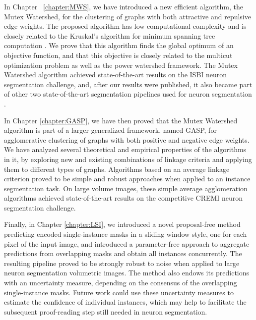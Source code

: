 In Chapter ~\ref{chapter:MWS}, we have introduced a new efficient algorithm, the Mutex Watershed, for the clustering of graphs with both attractive and repulsive edge weights. The proposed algorithm has low computational complexity and is closely related to the Kruskal's algorithm for minimum spanning tree computation \cite{kruskal1956shortest}.
We prove that this algorithm finds the global optimum of an objective function, and that this objective is closely related to the multicut optimization problem as well as the power watershed framework.
The Mutex Watershed algorithm achieved state-of-the-art results on the ISBI neuron segmentation challenge, and, after our results were published, it also became part of other two state-of-the-art segmentation pipelines used for neuron segmentation \cite{hirsch2020patchperpix,lee2019learning}.

In Chapter \ref{chapter:GASP}, we have then proved that the Mutex Watershed algorithm is part of a larger generalized framework, named GASP, for agglomerative clustering of graphs with both positive and negative edge weights. We have analyzed several theoretical and empirical properties of the algorithms in it, by exploring new and existing combinations of linkage criteria and applying them to different types of graphs. Algorithms based on an average linkage criterion proved to be simple and robust approaches when applied to an instance segmentation task. On large volume images, these simple average agglomeration algorithms achieved state-of-the-art results on the competitive CREMI neuron segmentation challenge. 

Finally, in Chapter \ref{chapter:LSI}, we introduced a novel proposal-free method predicting encoded single-instance masks in a sliding window style, one for each pixel of the input image, and introduced a parameter-free approach to aggregate predictions from overlapping masks and obtain all instances concurrently. The resulting pipeline proved to be strongly robust to noise when applied to large neuron segmentation volumetric images. 
The method also endows its predictions with an uncertainty measure, depending on the consensus of the overlapping  single-instance masks. Future work could use these uncertainty measures to estimate the confidence of individual instances, which may help to facilitate the subsequent proof-reading step still needed in neuron segmentation.

